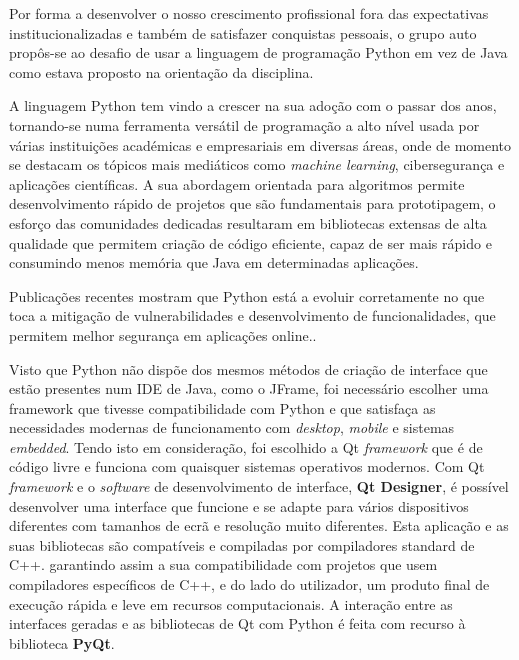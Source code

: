\documentclass[11pt,a4paper,twoside]{report}
\begin{document}
Por forma a desenvolver o nosso crescimento profissional fora das expectativas institucionalizadas e também de satisfazer conquistas pessoais, o grupo auto propôs-se ao desafio de usar a linguagem de programação Python em vez de Java como estava proposto na orientação da disciplina.

A linguagem Python tem vindo a crescer na sua adoção com o passar dos anos, tornando-se numa ferramenta versátil de programação a alto nível usada por várias instituições académicas e empresariais em diversas áreas, onde de momento se destacam os tópicos mais mediáticos como \textit{machine learning}, cibersegurança\cite{KukMilSpaGoc19} e aplicações científicas.
A sua abordagem orientada para algoritmos permite desenvolvimento rápido de projetos que são fundamentais para prototipagem\cite{Redondo_2015}, o esforço das comunidades dedicadas resultaram em bibliotecas extensas de alta qualidade que permitem criação de código eficiente, capaz de ser mais rápido e consumindo menos memória que Java em determinadas aplicações\cite{KukMilSpaGoc19}.

Publicações recentes mostram que Python está a evoluir corretamente no que toca a mitigação de vulnerabilidades e desenvolvimento de funcionalidades, que permitem melhor segurança em aplicações online.\cite{khwaja+murtaza+ahmed2020}.

Visto que Python não dispõe dos mesmos métodos de criação de interface que estão presentes num IDE de Java, como o JFrame, foi necessário escolher uma framework que tivesse compatibilidade  com Python e que satisfaça as necessidades modernas de funcionamento com \textit{desktop}, \textit{mobile} e sistemas \textit{embedded}.
Tendo isto em consideração, foi escolhido a Qt \textit{framework} que é de código livre e funciona com quaisquer sistemas operativos modernos. 
Com Qt \textit{framework} e o \textit{software} de desenvolvimento de interface, \textbf{Qt Designer}, é possível desenvolver uma interface que funcione e se adapte para vários dispositivos diferentes com tamanhos de ecrã e resolução muito diferentes. 
Esta aplicação e as suas bibliotecas são compatíveis e compiladas por compiladores standard de C++. garantindo assim a sua compatibilidade com projetos que usem compiladores específicos de C++, e do lado do utilizador, um produto final de execução rápida e leve em recursos computacionais\cite{Neto2017}.
A interação entre as interfaces geradas e as bibliotecas de Qt com Python é feita com recurso à biblioteca \textbf{PyQt}.
\end{document}
